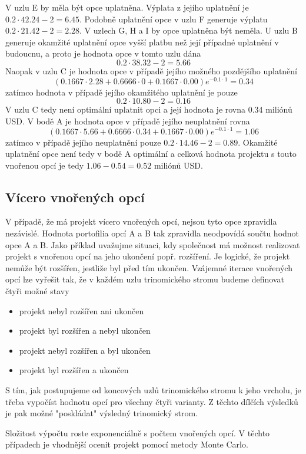 \documentclass[a4paper]{book}
\begin{document}
V uzlu E by měla být opce uplatněna. Výplata z jejího uplatnění je $0.2 \cdot 42.24 - 2 = 6.45$. Podobně uplatnění opce v uzlu F generuje výplatu $0.2 \cdot 21.42 - 2 = 2.28$. V uzlech G, H a I by opce uplatněna být neměla. U uzlu B generuje okamžité uplatnění opce vyšší platbu než její případné uplatnění v budoucnu, a proto je hodnota opce v tomto uzlu dána
\begin{equation*}
0.2 \cdot 38.32 - 2 = 5.66
\end{equation*}
Naopak v uzlu C je hodnota opce v případě jejího možného pozdějšího uplatnění
\begin{equation*}
(0.1667 \cdot 2.28 + 0.6666 \cdot 0 + 0.1667 \cdot 0.00)e^{-0.1 \cdot 1} = 0.34
\end{equation*}
zatímco hodnota v případě jejího okamžitého uplatnění je pouze
\begin{equation*}
0.2 \cdot 10.80 - 2 = 0.16
\end{equation*}
V uzlu C tedy není optimální uplatnit opci a její hodnota je rovna 0.34 miliónů USD. V bodě A je hodnota opce v případě jejího neuplatnění rovna
\begin{equation*}
(0.1667 \cdot 5.66 + 0.6666 \cdot 0.34 + 0.1667 \cdot 0.00)e^{-0.1 \cdot 1} = 1.06
\end{equation*}
zatímco v případě jejího neuplatnění pouze $0.2 \cdot 14.46 - 2 = 0.89$. Okamžité uplatnění opce není tedy v bodě A optimální a celková hodnota projektu s touto vnořenou opcí je tedy $1.06 - 0.54 = 0.52$ miliónů USD.

\subsection{Vícero vnořených opcí}

V případě, že má projekt vícero vnořených opcí, nejsou tyto opce zpravidla nezávislé. Hodnota portofilia opcí A a B tak zpravidla neodpovídá součtu hodnot opce A a B. Jako příklad uvažujme situaci, kdy společnost má možnost realizovat projekt s vnořenou opcí na jeho ukončení popř. rozšíření. Je logické, že projekt nemůže být rozšířen, jestliže byl před tím ukončen. Vzájemné iterace vnořených opcí lze vyřešit tak, že v každém uzlu trinomického stromu budeme definovat čtyři možné stavy
\begin{itemize}
\item projekt nebyl rozšířen ani ukončen
\item projekt byl rozšířen a nebyl ukončen
\item projekt nebyl rozšířen a byl ukončen
\item projekt byl rozšířen a ukončen
\end{itemize}
S tím, jak postupujeme od koncových uzlů trinomického stromu k jeho vrcholu, je třeba vypočíst hodnotu opcí pro všechny čtyři varianty. Z těchto dílčích výsledků je pak možné "poskládat" výsledný trinomický strom.

Složitost výpočtu roste exponenciálně s počtem vnořených opcí. V těchto případech je vhodnější ocenit projekt pomocí metody Monte Carlo.
\end{document}
